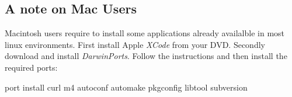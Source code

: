 \subsection{A note on Mac Users}
Macintosh users require to install some applications already availalble in most linux environments. First install Apple \emph{XCode} from your DVD. Secondly download and install \emph{DarwinPorts}. Follow the instructions and then install the required ports:
\begin{shell}
port install curl m4 autoconf automake pkgconfig libtool subversion
\end{shell}
